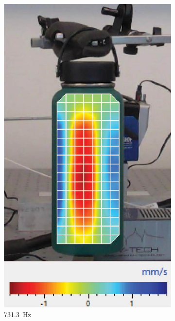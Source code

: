 \documentclass[twoside,a4paper]{article}
\begin{document}
\begin{figure}[!t]
\begin{subfigure}[b]{.317\columnwidth}
         \includegraphics[width=\columnwidth]{Paper/Figures/NoWater_731_3.jpg}
         \caption{731.3\ Hz}
    \end{subfigure}
    \begin{subfigure}[b]{.32\columnwidth}
         \centering

\end{subfigure}
\end{figure}
\end{document}
